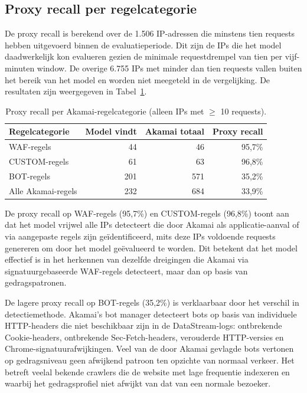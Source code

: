 \subsection{Proxy recall per regelcategorie}
 
De proxy recall is berekend over de 1.506 IP-adressen die minstens tien requests hebben uitgevoerd binnen de evaluatieperiode. Dit zijn de IPs die het model daadwerkelijk kon evalueren gezien de minimale requestdrempel van tien per vijf-minuten window. De overige 6.755 IPs met minder dan tien requests vallen buiten het bereik van het model en worden niet meegeteld in de vergelijking. De resultaten zijn weergegeven in Tabel~\ref{tab:proxy-recall}.
 
\begin{table}[h]
\centering
\caption{Proxy recall per Akamai-regelcategorie (alleen IPs met $\geq$ 10 requests).}
\label{tab:proxy-recall}
\begin{tabular}{l r r r}
\hline
\textbf{Regelcategorie} & \textbf{Model vindt} & \textbf{Akamai totaal} & \textbf{Proxy recall} \\
\hline
WAF-regels & 44 & 46 & 95,7\% \\
CUSTOM-regels & 61 & 63 & 96,8\% \\
BOT-regels & 201 & 571 & 35,2\% \\
Alle Akamai-regels & 232 & 684 & 33,9\% \\
\hline
\end{tabular}
\end{table}
 
De proxy recall op WAF-regels (95,7\%) en CUSTOM-regels (96,8\%) toont aan dat het model vrijwel alle IPs detecteert die door Akamai als applicatie-aanval of via aangepaste regels zijn geïdentificeerd, mits deze IPs voldoende requests genereren om door het model geëvalueerd te worden. Dit betekent dat het model effectief is in het herkennen van dezelfde dreigingen die Akamai via signatuurgebaseerde WAF-regels detecteert, maar dan op basis van gedragspatronen.
 
De lagere proxy recall op BOT-regels (35,2\%) is verklaarbaar door het verschil in detectiemethode. Akamai's bot manager detecteert bots op basis van individuele HTTP-headers die niet beschikbaar zijn in de DataStream-logs: ontbrekende Cookie-headers, ontbrekende Sec-Fetch-headers, verouderde HTTP-versies en Chrome-signatuurafwijkingen. Veel van de door Akamai gevlagde bots vertonen op gedragsniveau geen afwijkend patroon ten opzichte van normaal verkeer. Het betreft veelal bekende crawlers die de website met lage frequentie indexeren en waarbij het gedragsprofiel niet afwijkt van dat van een normale bezoeker.
 
